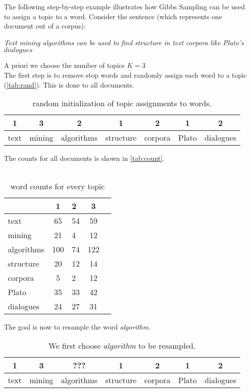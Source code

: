 \documentclass[a4paper,ngerman, english]{atseminar}
\begin{document}
\begin{example}
The following step-by-step example illustrates how Gibbs Sampling can be used to assign a topic to a word.
Consider the sentence (which represents one document out of a corpus):

\vspace{1cm}
\textit{Text mining algorithms can be used to find structure in text corpora like Plato’s $dialogues$}
\vspace{1cm}

A priori we choose the number of topics $K=3$
\\
The first step is to remove stop words and randomly assign each word to a topic (\autoref{tab:rand}). This is done to all documents.
\\
\begin{table}[h]
\centering
\caption{random initialization of topic assignments to words.}
\label{tab:rand}
\begin{tabular}{| c | c | c | c | c | c | c | }
\hline
1 & 3 & 2 & 1 & 2 & 1 & 2 \\
\hline 
text & mining & algorithms & structure & corpora & Plato & dialogues \\
\hline
\end{tabular}
\end{table}

The counts for all documents is shown in \autoref{tab:count}.
\\ \\
\begin{table}[h]
\centering
\caption{word counts for every topic}
\label{tab:count}
\begin{tabular}{| l | c l c | c  }
\hline
& \textbf{1} & \textbf{2} & \textbf{3} \\
\hline 
text & 65 & 54 & 59 \\
mining &  21 & 4 & 12 \\
algorithms & 100 & 74 & 122 \\
structure & 20 & 12 & 14 \\
corpora &  5 & 2 & 12 \\
Plato &  35 & 33 & 42 \\
dialogues &  24 & 27 & 31 \\
\hline
\end{tabular}
\end{table}

The goal is now to resample the word \textit{algorithm}.

\begin{table}[h]
\centering
\caption{We first choose \textit{algorithm} to be resampled.}
\begin{tabular}{ | c | c | c | c | c | c | c |}
\hline
1 & 3 & ??? & 1 & 2 & 1 & 2 \\
\hline
text & mining & algorithms & structure & corpora & Plato & dialogues \\
\hline
\end{tabular}
\end{table}


\end{example}
\end{document}
